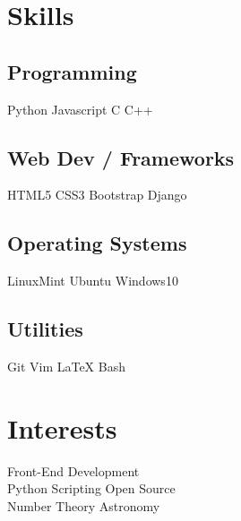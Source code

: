 \documentclass[]{deedy-resume-openfont}
\begin{document}
\begin{minipage}[t]{0.33\textwidth}

\section{Skills}
\subsection{Programming}
Python \textbullet{} Javascript \textbullet{} C \textbullet{} C++ \\   
\vspace{0.3 cm} 
\subsection{Web Dev / Frameworks}
HTML5 \textbullet{} CSS3 \textbullet{} Bootstrap \textbullet{} Django \\ 
\vspace{0.3 cm}
\subsection{Operating Systems}
LinuxMint \textbullet{} Ubuntu \textbullet{} Windows10 \\
\vspace{0.3 cm}
\subsection{Utilities}
Git \textbullet{} Vim \textbullet{} \LaTeX{} \textbullet{} Bash  \\


\section{Interests}
Front-End Development  \\
Python Scripting \textbullet{} Open Source \\
Number Theory  \textbullet{} Astronomy \\
%
%

\end{minipage} 
\end{document}
